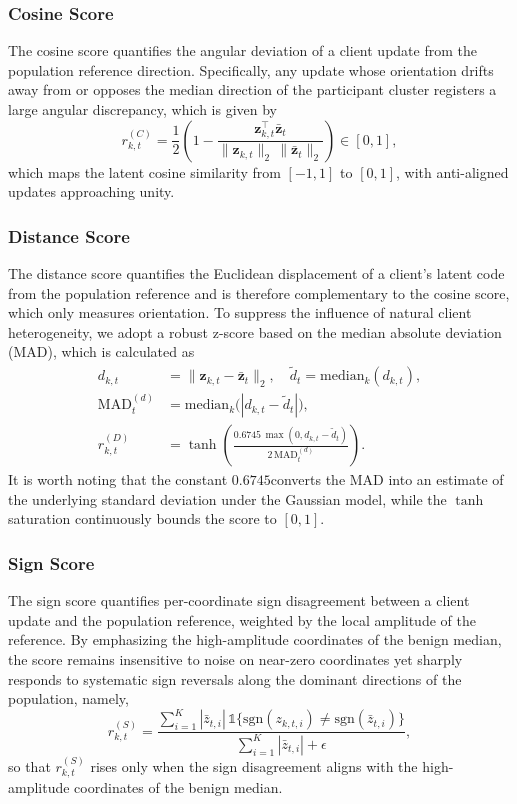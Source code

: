 \documentclass[journal]{IEEEtran}
\begin{document}
\subsubsection{Cosine Score}
The cosine score quantifies the angular deviation of a client update from the population reference direction. Specifically, any update whose orientation drifts away from or opposes the median direction of the participant cluster registers a large angular discrepancy, which is given by
\begin{equation}
r_{k,t}^{(C)} = \frac{1}{2}\!\left(1 - \frac{\mathbf{z}_{k,t}^{\!\top} \bar{\mathbf{z}}_t}{\|\mathbf{z}_{k,t}\|_2 \, \|\bar{\mathbf{z}}_t\|_2}\right) \in [0,1],
\label{eq:cos_score}
\end{equation}
which maps the latent cosine similarity from $[-1,1]$ to $[0,1]$, with anti-aligned updates approaching unity.

\subsubsection{Distance Score}
The distance score quantifies the Euclidean displacement of a client's latent code from the population reference and is therefore complementary to the cosine score, which only measures orientation. To suppress the influence of natural client heterogeneity, we adopt a robust z-score based on the median absolute deviation (MAD), which is calculated as
\begin{align}
d_{k,t} &= \|\mathbf{z}_{k,t} - \bar{\mathbf{z}}_t\|_2, \quad \tilde{d}_t = \mathrm{median}_k(d_{k,t}), \label{eq:dist_raw}\\
\mathrm{MAD}_t^{(d)} &= \mathrm{median}_k\bigl(|d_{k,t} - \tilde{d}_t|\bigr), \label{eq:dist_mad}\\
r_{k,t}^{(D)} &= \tanh\!\left(\frac{0.6745 \, \max(0, d_{k,t}-\tilde{d}_t)}{2\,\mathrm{MAD}_t^{(d)}}\right). \label{eq:dist_score}
\end{align}
It is worth noting that the constant $0.6745$\cite{nist_modified_zscore}converts the MAD into an estimate of the underlying standard deviation under the Gaussian model, while the $\tanh$ saturation continuously bounds the score to $[0,1]$.

\subsubsection{Sign Score}
The sign score quantifies per-coordinate sign disagreement between a client update and the population reference, weighted by the local amplitude of the reference. By emphasizing the high-amplitude coordinates of the benign median, the score remains insensitive to noise on near-zero coordinates yet sharply responds to systematic sign reversals along the dominant directions of the population, namely,
\begin{equation}
r_{k,t}^{(S)} = \frac{\sum_{i=1}^{K} |\bar z_{t,i}|\,\mathbb{1}\{\mathrm{sgn}(z_{k,t,i}) \neq \mathrm{sgn}(\bar z_{t,i})\}}{\sum_{i=1}^{K} |\bar z_{t,i}| + \epsilon},
\label{eq:sign_score}
\end{equation}
so that $r_{k,t}^{(S)}$ rises only when the sign disagreement aligns with the high-amplitude coordinates of the benign median.
\end{document}
